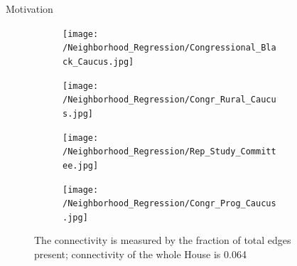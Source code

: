 \documentclass[final]{beamer}
\newlength{\sepwid}
\newlength{\onecolwid}
\newlength{\twocolwid}
\begin{document}
\begin{frame}[t]
\begin{columns}[t]
\begin{column}{\onecolwid}
\begin{block}{Motivation}
\begin{figure}[h]
  \centering
    \begin{subfigure}[b]{0.49\textwidth}
        \texttt{[image: /Neighborhood\_Regression/Congressional\_Black\_Caucus.jpg]}
    \end{subfigure}
          \begin{subfigure}[b]{0.49\textwidth}
        \texttt{[image: /Neighborhood\_Regression/Congr\_Rural\_Caucus.jpg]}
    \end{subfigure}
        \begin{subfigure}[b]{0.49\textwidth}
        \texttt{[image: /Neighborhood\_Regression/Rep\_Study\_Committee.jpg]}
    \end{subfigure}
          \begin{subfigure}[b]{0.49\textwidth}
        \texttt{[image: /Neighborhood\_Regression/Congr\_Prog\_Caucus.jpg]}
    \end{subfigure}
\caption{The connectivity is measured by the fraction of total edges present; connectivity of the whole House is 0.064}
\end{figure}


\end{block}




\end{column} %

\begin{column}{\sepwid}\end{column} %

\begin{column}{\twocolwid} %

\begin{columns}[t,totalwidth=\twocolwid] %

\begin{column}{\onecolwid}\vspace{-.6in} %



\end{column}
\end{columns}
\end{column}
\end{columns}
\end{frame}
\end{document}
